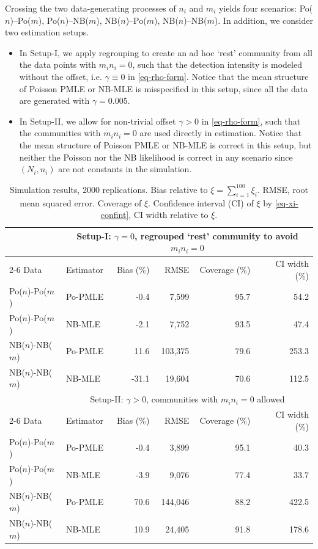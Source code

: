 Crossing the two data-generating processes of $n_i$ and $m_i$ yields four scenarios: 
Po($n$)--Po($m$), Po($n$)--NB($m$), NB($n$)--Po($m$), NB($n$)--NB($m$). 
In addition, we consider two estimation setups. 
\begin{itemize} 
\item In Setup-I, we apply regrouping to create an ad hoc `rest' community from all the data points with $m_i n_i =0$, such that the detection intensity is modeled without the offset, i.e. $\gamma \equiv 0$ in \eqref{eq-rho-form}. Notice that the mean structure of Poisson PMLE or NB-MLE is misspecified in this setup, since all the data are generated with $\gamma =0.005$. 
\item In Setup-II, we allow for non-trivial offset $\gamma >0$ in \eqref{eq-rho-form}, such that the communities with $m_i n_i =0$ are used directly in estimation. Notice that the mean structure of Poisson PMLE or NB-MLE is correct in this setup, but neither the Poisson nor the NB likelihood is correct in any scenario since $(N_i,n_i)$ are not constants in the simulation.
\end{itemize}

\begin{table}[H]
\centering
\caption{\label{tbl-sim-summary}Simulation results, 2000 replications. Bias relative to $\xi = \sum_{i=1}^{100} \xi_i$. RMSE, root mean squared error. Coverage of $\xi$. Confidence interval (CI) of $\xi$ by \eqref{eq-xi-confint}, CI width relative to $\xi$.}
\begin{tabular}{llrrrr} \toprule
& \multicolumn{5}{c}{Setup-I: $\gamma =0$, regrouped `rest' community to avoid $m_i n_i =0$} \\ \cline{2-6}
Data & Estimator & Bias (\%) & RMSE & Coverage (\%) & CI width (\%)\\ \midrule
Po($n$)-Po($m$) & Po-PMLE & -0.4 & 7,599 & 95.7 & 54.2 \\
Po($n$)-Po($m$) & NB-MLE & -2.1 & 7,752 & 93.5 & 47.4 \\
NB($n$)-NB($m$) & Po-PMLE & 11.6 & 103,375 & 79.6 & 253.3 \\
NB($n$)-NB($m$) & NB-MLE & -31.1 & 19,604 & 70.6 & 112.5 \\
\bottomrule
& \multicolumn{5}{c}{Setup-II: $\gamma >0$, communities with $m_i n_i =0$ allowed}\\ \cline{2-6}
Data & Estimator & Bias (\%) & RMSE & Coverage (\%) & CI width (\%)\\ \midrule
Po($n$)-Po($m$) & Po-PMLE & -0.4 & 3,899 & 95.1 & 40.3 \\
Po($n$)-Po($m$) & NB-MLE & -3.9 & 9,076 & 77.4 & 33.7 \\
NB($n$)-NB($m$) & Po-PMLE & 70.6 & 144,046 & 88.2 & 422.5 \\
NB($n$)-NB($m$) & NB-MLE & 10.9 & 24,405 & 91.8 & 178.6 \\
\bottomrule
\end{tabular}
\end{table}


